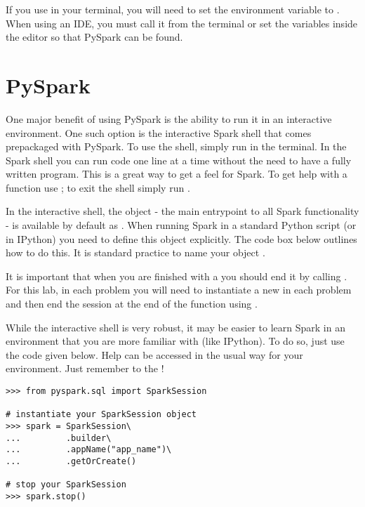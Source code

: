 If you use  in your terminal, you will need to set the  environment variable to .
When using an IDE, you must call it from the terminal or set the variables inside the editor so that PySpark can be found.


\section*{PySpark} %
One major benefit of using PySpark is the ability to run it in an interactive environment. 
One such option is the interactive Spark shell that comes prepackaged with PySpark. 
To use the shell, simply run  in the terminal. 
In the Spark shell you can run code one line at a time without the need to have a fully written program. This is a great way to get a feel for Spark. 
To get help with a function use ; to exit the shell simply run .

In the interactive shell, the  object - the main entrypoint to all Spark functionality - is available by default as . 
When running Spark in a standard Python script (or in IPython) you need to define this object explicitly. The code box below outlines how to do this. 
It is standard practice to name your  object .

\begin{warn}
It is important that when you are finished with a  you should end it by calling . For this lab, in each problem you will need to instantiate a new  in each problem and then end the session at the end of the function using .
\end{warn}

\begin{info}
While the interactive shell is very robust, it may be easier to learn Spark in an environment that you are more familiar with (like IPython). 
To do so, just use the code given below. Help can be accessed in the usual way for your environment. 
Just remember to  the !
\end{info}

\begin{lstlisting}
>>> from pyspark.sql import SparkSession

# instantiate your SparkSession object
>>> spark = SparkSession\
...			.builder\
...			.appName("app_name")\
...			.getOrCreate()

# stop your SparkSession
>>> spark.stop()
\end{lstlisting}

